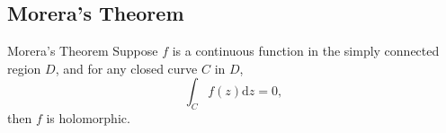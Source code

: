 \subsection{Morera's Theorem}

\begin{theorem}{Morera's Theorem}{}
  Suppose $f$ is a continuous function in the simply connected region $D$,
  and for any closed curve $C$ in $D$,
  \begin{equation}
    \int_C f(z)\mathrm{d} z = 0,
  \end{equation}
  then $f$ is holomorphic.
\end{theorem}


